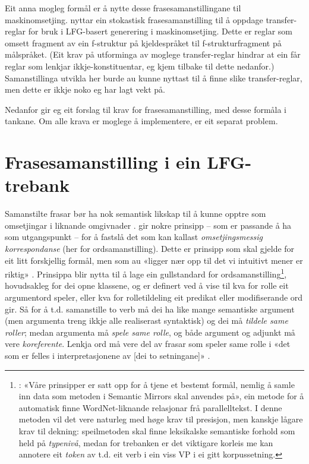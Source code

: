 \documentclass[11pt,a4paper,oneside,draft]{book}
\begin{document}
Eit anna mogleg formål er å nytte desse frasesamanstillingane til
maskinomsetjing. \citet{riezler2006gmt} nyttar ein stokastisk
frasesamanstilling til å oppdage transfer-reglar for bruk i LFG-basert
generering i maskinomsetjing. Dette er reglar som omsett fragment av
ein f-struktur på kjeldespråket til f-strukturfragment på
målspråket. (Eit krav på utforminga av moglege transfer-reglar hindrar
at ein får reglar som lenkjar ikkje-konstituentar, eg kjem tilbake til
dette nedanfor.)  Samanstillinga utvikla her burde au kunne nyttast
til å finne slike transfer-reglar, men dette er ikkje noko eg har lagt
vekt på.

Nedanfor gir eg eit forslag til krav for frasesamanstilling, med desse
formåla i tankane. Om alle krava er moglege å implementere, er eit
separat problem.

\section{Frasesamanstilling i ein LFG-trebank}
\label{sec-3.3}


Samanstilte frasar bør ha nok semantisk likskap til å kunne opptre som
omsetjingar i liknande omgivnader
\citep[s.~74]{dyvik2009lmp}. \citet{thunes2003eal} gir nokre prinsipp
-- som er passande å ha som utgangspunkt -- for å fastslå det som kan
kallast \emph{omsetjingsmessig korrespondanse} (her for
ordsamanstilling). Dette er prinsipp som skal gjelde for eit litt
forskjellig formål, men som au «ligger nær opp til det vi intuitivt
mener er riktig» \citep[s.~2]{thunes2003eal}. Prinsippa blir nytta til
å lage ein gullstandard for ordsamanstilling\footnote{\cite[s.~2]{thunes2003eal}: «Våre prinsipper er satt
       opp for å tjene et bestemt formål, nemlig å samle inn data som
       metoden i Semantic Mirrors skal anvendes på», ein metode for å
       automatisk finne WordNet-liknande relasjonar frå
       parallelltekst. I denne metoden vil det vere naturleg med høge
       krav til presisjon, men kanskje lågare krav til dekning:
       speilmetoden skal finne leksikalske semantiske forhold som held
       på \emph{typenivå}, medan for trebanken er det viktigare korleis me
       kan annotere eit \emph{token} av t.d. eit verb i ein viss VP i ei
       gitt korpussetning. },
hovudsakleg for dei opne klassene, og er definert ved å vise til kva
for rolle eit argumentord speler, eller kva for rolletildeling eit
predikat eller modifiserande ord gir. Så for å t.d. samanstille to
verb må dei ha like mange semantiske argument (men argumenta treng
ikkje alle realiserast syntaktisk) og dei må \emph{tildele same roller};
medan argumenta må \emph{spele same rolle}, og både argument og adjunkt må
vere \emph{koreferente}. Lenkja ord må vere del av frasar som speler same
rolle i «det som er felles i interpretasjonene av [dei to setningane]»
\citep[s.~3]{thunes2003eal}.
\end{document}
